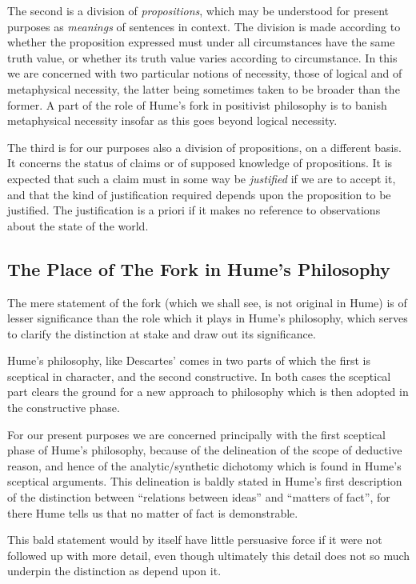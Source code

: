 The second is a division of \emph{propositions}, which may be
understood for present purposes as \emph{meanings} of sentences in
context.
The division is made according to whether the proposition
expressed must under all circumstances have the same truth value, or
whether its truth value varies according to circumstance.
In this we are concerned with two particular notions of necessity,
those of logical and of metaphysical necessity, the latter being
sometimes taken to be broader than the former.
A part of the role of Hume's fork in positivist philosophy is to
banish metaphysical necessity insofar as this goes beyond logical necessity.

The third is for our purposes also a division of propositions, on a
different basis.
It concerns the status of claims or of supposed knowledge of
propositions. 
It is expected that such a claim must in some way be
\emph{justified} if we are to accept it, and that the kind of
justification required depends upon the proposition to be justified.
The justification is a priori if it makes no reference to observations
about the state of the world.

\subsection{The Place of The Fork in Hume's Philosophy}

The mere statement of the fork (which we shall see, is not original in
Hume) is of lesser significance than the role which it plays in Hume's
philosophy, which serves to clarify the distinction at stake and draw
out its significance.

Hume's philosophy, like Descartes' comes in two parts of which the
first is sceptical in character, and the second constructive.
In both cases the sceptical part clears the ground for a new approach
to philosophy which is then adopted in the constructive phase.

For our present purposes we are concerned principally with the first
sceptical phase of Hume's philosophy, because of the delineation of the scope
of deductive reason, and hence of the analytic/\-synthetic dichotomy
which is found in Hume's sceptical arguments.
This delineation is baldly stated in Hume's first description of the
distinction between ``relations between ideas'' and ``matters of
fact'', for there Hume tells us that no matter of fact is
demonstrable.

This bald statement would by itself have little persuasive force if it
were not followed up with more detail, even though ultimately this
detail does not so much underpin the distinction as depend upon it.

